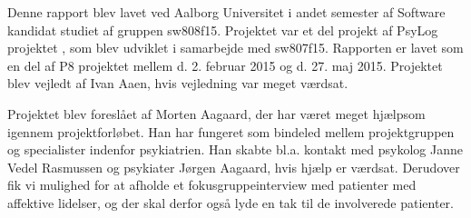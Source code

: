 Denne rapport blev lavet ved Aalborg Universitet i andet semester af Software kandidat studiet af gruppen sw808f15.
Projektet var et del projekt af PsyLog projektet \citep{misc:faellesrapp}, som blev udviklet i samarbejde med sw807f15.
Rapporten er lavet som en del af P8 projektet mellem d. 2. februar 2015 og d. 27. maj 2015.
Projektet blev vejledt af Ivan Aaen, hvis vejledning var meget værdsat.

Projektet blev foreslået af Morten Aagaard, der har været meget hjælpsom igennem projektforløbet.
Han har fungeret som bindeled mellem projektgruppen og specialister indenfor psykiatrien. 
Han skabte bl.a. kontakt med psykolog Janne Vedel Rasmussen og psykiater Jørgen Aagaard, hvis hjælp er værdsat.
Derudover fik vi mulighed for at afholde et fokusgruppeinterview med patienter med affektive lidelser, og der skal derfor også lyde en tak til de involverede patienter.